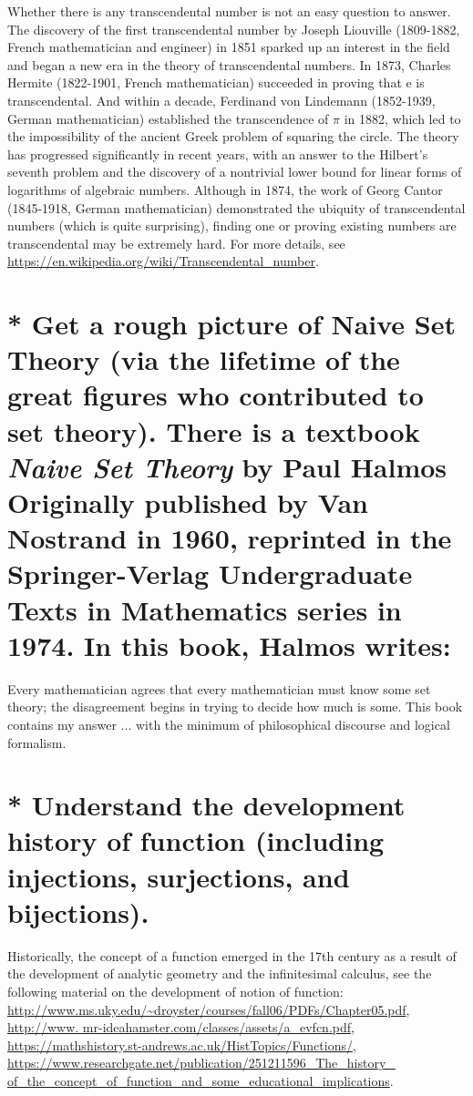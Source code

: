\documentclass{article}
\begin{document}
\begin{tcolorbox}
  Whether there is any transcendental number is not an easy question to answer. 
  The discovery of the first transcendental number by Joseph Liouville (1809-1882, French mathematician and engineer) in 1851 sparked up an interest in the field and began a new era in the theory of transcendental numbers. 
  In 1873, Charles Hermite (1822-1901, French mathematician) succeeded in proving that e is transcendental. And within a decade, Ferdinand von Lindemann (1852-1939, German mathematician) established the transcendence of $ \pi $ in 1882, which led to the impossibility of the ancient Greek problem of squaring the circle. 
  The theory has progressed significantly in recent years, with an answer to the Hilbert's seventh problem and the discovery of a nontrivial lower bound for linear forms of logarithms of algebraic numbers. 
  Although in 1874, the work of Georg Cantor (1845-1918, German mathematician) demonstrated the ubiquity of transcendental numbers (which is quite surprising), finding one or proving existing numbers are transcendental may be extremely hard. 
  For more details, see \url{https://en.wikipedia.org/wiki/Transcendental_number}.
\end{tcolorbox}

\section{* Get a rough picture of Naive Set Theory (via the lifetime of the great figures who contributed to set theory). There is a textbook \textit{Naive Set Theory} by Paul Halmos Originally published by Van Nostrand in 1960, reprinted in the Springer-Verlag Undergraduate Texts in Mathematics series in 1974. In this book, Halmos writes:}

\begin{tcolorbox}
  Every mathematician agrees that every mathematician must know some set theory; the disagreement begins in trying to decide how much is some. This book contains my answer ... with the minimum of philosophical discourse and logical formalism.
\end{tcolorbox}

\section{* Understand the development history of function (including injections, surjections, and bijections).}

\begin{tcolorbox}
  Historically, the concept of a function emerged in the 17th century as a result of the development of analytic geometry and the infinitesimal calculus, see the following material on the development of notion of function: \url{http://www.ms.uky.edu/~droyster/courses/fall06/PDFs/Chapter05.pdf}, \url{http://www. mr-ideahamster.com/classes/assets/a_evfcn.pdf}, \url{https://mathshistory.st-andrews.ac.uk/HistTopics/Functions/}, \url{https://www.researchgate.net/publication/251211596_The_history_ of_the_concept_of_function_and_some_educational_implications}.
\end{tcolorbox}
\end{document}
